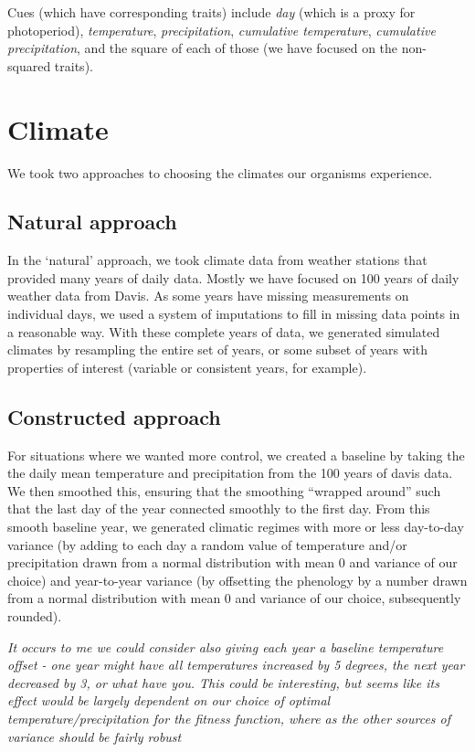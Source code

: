 \documentclass[11pt,a4paper]{article}
\begin{document}
Cues (which have corresponding traits) include \textit{day} (which is a proxy for photoperiod), \textit{temperature}, \textit{precipitation}, \textit{cumulative temperature}, \textit{cumulative precipitation}, and the square of each of those (we have focused on the non-squared traits). 

\section{Climate}
We took two approaches to choosing the climates our organisms experience. 
\subsection{Natural approach}\label{sec:climate1}
In the `natural' approach, we took climate data from weather stations that provided many years of daily data. Mostly we have focused on 100 years of daily weather data from Davis. As some years have missing measurements on individual days, we used a system of imputations to fill in missing data points in a reasonable way. With these complete years of data, we generated simulated climates by resampling the entire set of years, or some subset of years with properties of interest (variable or consistent years, for example). 

\subsection{Constructed approach}\label{sec:climate2}
For situations where we wanted more control, we created a baseline by taking the the daily mean temperature and precipitation from the 100 years of davis data. We then smoothed this, ensuring that the smoothing ``wrapped around'' such that the last day of the year connected smoothly to the first day. From this smooth baseline year, we generated climatic regimes with more or less day-to-day variance (by adding to each day a random value of temperature and/or precipitation drawn from a normal distribution with mean 0 and variance of our choice) and year-to-year variance (by offsetting the phenology by a number drawn from a normal distribution with mean 0 and variance of our choice, subsequently rounded). 

\textit{It occurs to me we could consider also giving each year a baseline temperature offset - one year might have all temperatures increased by 5 degrees, the next year decreased by 3, or what have you. This could be interesting, but seems like its effect would be largely dependent on our choice of optimal temperature/precipitation for the fitness function, where as the other sources of variance should be fairly robust}
\end{document}
